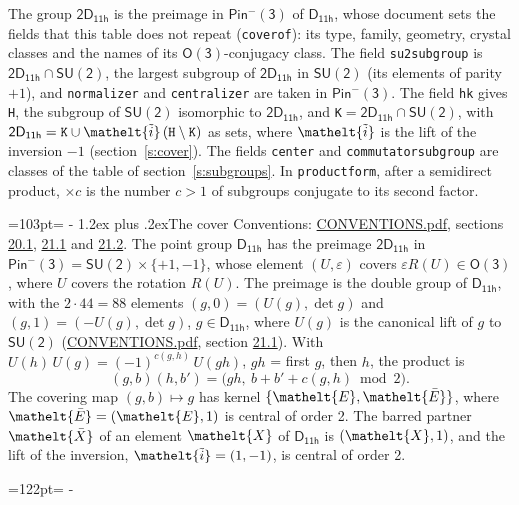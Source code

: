 \documentclass[10pt,a4paper]{article}
\makeatletter
\renewcommand\section{\@startsection{section}{1}{\z@}{-3ex plus -1ex minus -.2ex}%
  {1.2ex plus .2ex}{\normalfont\large\sffamily\bfseries\color{parttitle}}}
\newcommand{\needspace}[1]{\par\penalty-100\begingroup\dimen0=#1\relax\dimen2=\pagegoal
  \advance\dimen2-\pagetotal\ifdim\dimen0>\dimen2\relax\ifdim\dimen2>0pt\vfil\break\fi\fi
  \endgroup}
\numberwithin{equation}{section}
\newcommand{\eltfont}[1]{{\let\sigma\eltsigma\mathelt{#1}}}
\newcommand{\grp}[1]{\mathsf{#1}}
\newcommand{\elt}[1]{\eltfont{#1}}
\newcommand{\dirprod}{\times}
\newcommand{\barred}[1]{\bar{#1}}
\newcommand{\lift}[1]{\tilde{#1}}
\makeatother
\begin{document}
\leavevmode\label{n:element.inversion}\label{n:group.preimage}The group $\grp{2D_{11h}}$ is the preimage in $\grp{Pin^{-}(3)}$ of \href{../../../rotation/data/pdf/D11h.pdf}{$\grp{D_{11h}}$}, whose document sets the fields that this table does not repeat (\texttt{coverof}): its type, family, geometry, crystal classes and the names of its \href{../../../rotation/data/pdf/O3.pdf}{$\grp{O(3)}$}-conjugacy class. The field \texttt{su2subgroup} is $\grp{2D_{11h}} \cap \grp{SU(2)}$, the largest subgroup of $\grp{2D_{11h}}$ in $\grp{SU(2)}$ (its elements of parity $+1$), and \texttt{normalizer} and \texttt{centralizer} are taken in $\grp{Pin^{-}(3)}$. The field \texttt{hk} gives \texttt{H}, the subgroup of $\grp{SU(2)}$ isomorphic to $\grp{2D_{11h}}$, and \texttt{K}${} = \grp{2D_{11h}} \cap \grp{SU(2)}$, with $\grp{2D_{11h}} = \texttt{K} \cup \elt{\lift{i}}\,(\texttt{H} \setminus \texttt{K})$ as sets, where $\elt{\lift{i}}$ is the lift of the inversion $-1$ (section~\ref{s:cover}). The fields \texttt{center} and \texttt{commutatorsubgroup} are classes of the table of section~\ref{s:subgroups}.
\leavevmode\label{n:index.conjugates.c}In \texttt{productform}, after a semidirect product, ${\times}c$ is the number $c > 1$ of subgroups conjugate to its second factor.
\needspace{103pt}
\section{The cover}\label{s:cover}
Conventions: \href{../../CONVENTIONS.pdf}{CONVENTIONS.pdf}, sections \href{../../CONVENTIONS.pdf\#conv.20.1}{20.1}, \href{../../CONVENTIONS.pdf\#conv.21.1}{21.1} and \href{../../CONVENTIONS.pdf\#conv.21.2}{21.2}.
\leavevmode\label{n:group.pin.minus}\label{n:group.su2}\label{n:local.pin.sign}\label{n:matrix.covered}\label{n:matrix.lift.su2}\label{n:index.bar}The point group $\grp{D_{11h}}$ has the preimage $\grp{2D_{11h}}$ in $\grp{Pin^{-}(3)} = \grp{SU(2)} \dirprod \{+1, -1\}$, whose element $(U, \varepsilon)$ covers $\varepsilon R(U) \in \grp{O(3)}$, where $U$ covers the rotation $R(U)$. The preimage is the double group of $\grp{D_{11h}}$, with the $2 \cdot 44 = 88$ elements $(g, 0) = (U(g), \det g)$ and $(g, 1) = (-U(g), \det g)$, $g \in \grp{D_{11h}}$, where $U(g)$ is the canonical lift of $g$ to $\grp{SU(2)}$ (\href{../../CONVENTIONS.pdf}{CONVENTIONS.pdf}, section \href{../../CONVENTIONS.pdf\#conv.21.1}{21.1}). \label{n:function.cocycle}With $U(h)\,U(g) = (-1)^{c(g,h)}\,U(gh)$, $gh$ = first $g$, then $h$, the product is
\begin{equation}\label{e:product}(g, b)(h, b') = \bigl(gh,\ b + b' + c(g, h) \bmod 2\bigr).\end{equation}
\leavevmode\label{n:mark.bar}The covering map $(g, b) \mapsto g$ has kernel $\{\elt{E}, \elt{\barred{E}}\}$, where $\elt{\barred{E}} = (\elt{E}, 1)$ is central of order 2. \label{n:element.named}\label{n:mark.lift}The barred partner $\elt{\barred{X}}$ of an element $\elt{X}$ of $\grp{D_{11h}}$ is $(\elt{X}, 1)$, and the lift of the inversion, $\elt{\lift{i}} = (1, -1)$, is central of order 2.
\needspace{122pt}
\end{document}
